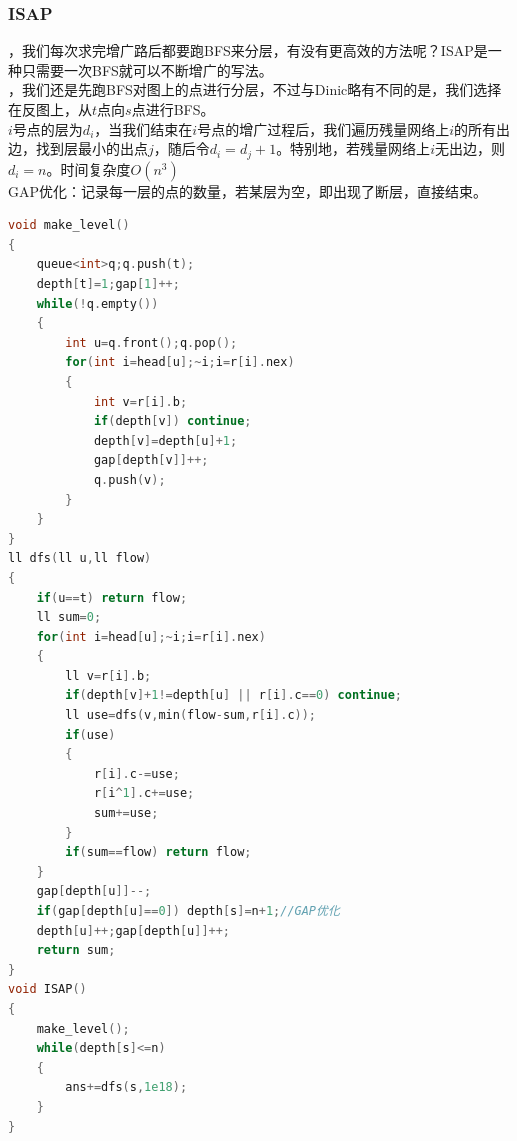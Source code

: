 \documentclass[a4paper]{book}
\begin{document}
\subsubsection{ISAP}
，我们每次求完增广路后都要跑BFS来分层，有没有更高效的方法呢？ISAP是一种只需要一次BFS就可以不断增广的写法。\\
，我们还是先跑BFS对图上的点进行分层，不过与Dinic略有不同的是，我们选择在反图上，从$t$点向$s$点进行BFS。\\
$i$号点的层为$d_i$，当我们结束在$i$号点的增广过程后，我们遍历残量网络上$i$的所有出边，找到层最小的出点$j$，随后令$d_i=d_j+1$。特别地，若残量网络上$i$无出边，则$d_i=n$。时间复杂度$O(n^3)$\\
\indent GAP优化：记录每一层的点的数量，若某层为空，即出现了断层，直接结束。
\begin{lstlisting}[language=c++,escapeinside=``]
void make_level()
{
    queue<int>q;q.push(t);
    depth[t]=1;gap[1]++;
    while(!q.empty())
    {
        int u=q.front();q.pop();
        for(int i=head[u];~i;i=r[i].nex)
        {
            int v=r[i].b;
            if(depth[v]) continue;
            depth[v]=depth[u]+1;
            gap[depth[v]]++;
            q.push(v);
        }
    }
}
ll dfs(ll u,ll flow)
{
    if(u==t) return flow;
    ll sum=0;
    for(int i=head[u];~i;i=r[i].nex)
    {
        ll v=r[i].b;
        if(depth[v]+1!=depth[u] || r[i].c==0) continue;
        ll use=dfs(v,min(flow-sum,r[i].c));
        if(use)
        {
            r[i].c-=use;
            r[i^1].c+=use;
            sum+=use;
        }	
        if(sum==flow) return flow;
    }
    gap[depth[u]]--;
    if(gap[depth[u]==0]) depth[s]=n+1;//GAP优化
    depth[u]++;gap[depth[u]]++;
    return sum;
}
void ISAP()
{
    make_level();
    while(depth[s]<=n) 
    {
        ans+=dfs(s,1e18);
    }
}
\end{lstlisting}
\end{document}
